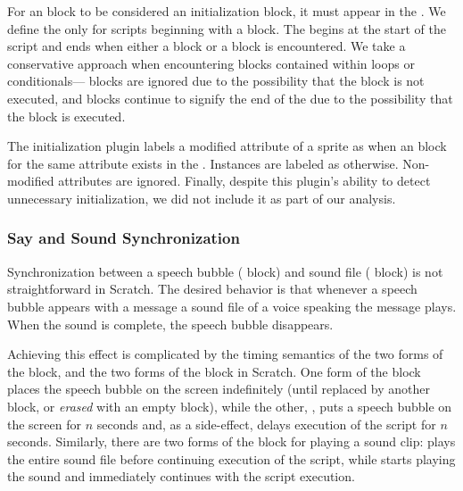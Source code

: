 For an \abs{} block to be considered an initialization block, it must appear in
the \initzone{}. We define the \initzone{} only for scripts beginning with a
\greenflag{} block. The \initzone{} begins at the start of the script and ends
when either a \rel{} block or a \broadcast{} block is encountered. We take a
conservative approach when encountering blocks contained within loops or
conditionals---\abs{} blocks are ignored due to the possibility that the block
is not executed, and \rel{} blocks continue to signify the end of the
\initzone{} due to the possibility that the block is executed.

The initialization plugin labels a modified attribute of a sprite as \correct{}
when an \abs{} block for the same attribute exists in the
\initzone{}. Instances are labeled as \incor{} otherwise. Non-modified
attributes are ignored. Finally, despite this plugin's ability to detect
unnecessary initialization, we did not include it as part of our analysis.


\subsubsection{Say and Sound Synchronization}
Synchronization between a speech bubble (\say{} block) and sound file
(\playsound{} block) is not straightforward in Scratch. The desired behavior is
that whenever a speech bubble appears with a message a sound file of a voice
speaking the message plays. When the sound is complete, the speech bubble
disappears.

Achieving this effect is complicated by the timing semantics of the two forms
of the \say{} block, and the two forms of the \playsound{} block in Scratch.
One form of the \say{} block places the speech bubble on the screen
indefinitely (until replaced by another \say{} block, or \emph{erased} with an
empty \say{} block), while the other, \sayfor{}, puts a speech bubble on the
screen for $n$ seconds and, as a side-effect, delays execution of the script
for $n$ seconds. Similarly, there are two forms of the block for playing a
sound clip: \playsounddone{} plays the entire sound file before continuing
execution of the script, while \playsound{} starts playing the sound and
immediately continues with the script execution.


